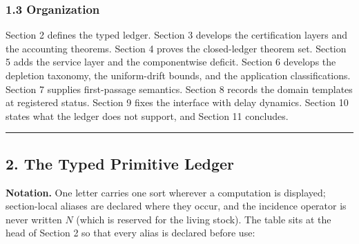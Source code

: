 \documentclass[11pt]{article}
\begin{document}
\subsubsection{1.3 Organization}\label{organization}

Section 2 defines the typed ledger. Section 3 develops the certification
layers and the accounting theorems. Section 4 proves the closed-ledger
theorem set. Section 5 adds the service layer and the componentwise
deficit. Section 6 develops the depletion taxonomy, the uniform-drift
bounds, and the application classifications. Section 7 supplies
first-passage semantics. Section 8 records the domain templates at
registered status. Section 9 fixes the interface with delay dynamics.
Section 10 states what the ledger does not support, and Section 11
concludes.

\begin{center}\rule{0.5\linewidth}{0.5pt}\end{center}

\subsection{2. The Typed Primitive
Ledger}\label{the-typed-primitive-ledger}

\textbf{Notation.} One letter carries one sort wherever a computation is
displayed; section-local aliases are declared where they occur, and the
incidence operator is never written \(N\) (which is reserved for the
living stock). The table sits at the head of Section 2 so that every
alias is declared before use:
\end{document}
